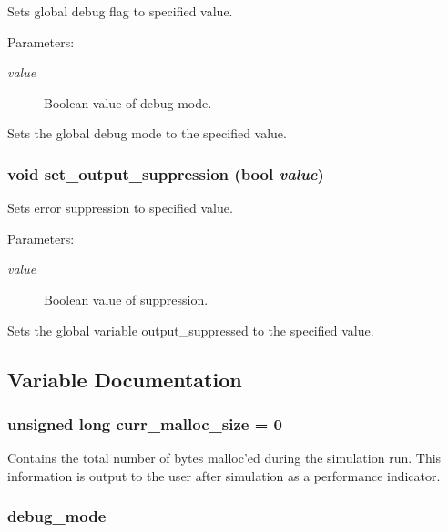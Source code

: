 Sets global debug flag to specified value.

\begin{Desc}
\item[Parameters:]
\begin{description}
\item[{\em value}]Boolean value of debug mode.\end{description}
\end{Desc}
Sets the global debug mode to the specified value. 
\subsubsection{\setlength{\rightskip}{0pt plus 5cm}void set\_\-output\_\-suppression ({\bf bool} {\em value})}\label{util_8c_a5}


Sets error suppression to specified value.

\begin{Desc}
\item[Parameters:]
\begin{description}
\item[{\em value}]Boolean value of suppression.\end{description}
\end{Desc}
Sets the global variable output\_\-suppressed to the specified value. 

\subsection{Variable Documentation}
\subsubsection{\setlength{\rightskip}{0pt plus 5cm}unsigned long curr\_\-malloc\_\-size = 0}\label{util_8c_a2}


Contains the total number of bytes malloc'ed during the simulation run. This information is output to the user after simulation as a performance indicator. 
\subsubsection{ debug\_\-mode}\label{util_8c_a1}


